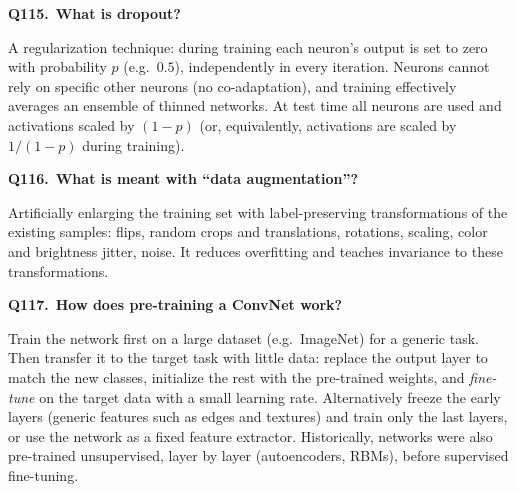 \documentclass[11pt,a4paper]{article}
\newcommand{\keep}[1]{\par
  \ifdim\dimexpr\pagegoal-\pagetotal\relax<#1\relax\newpage\fi}
\newcommand{\q}[2]{\keep{2.5cm}\medskip
  {\sffamily\bfseries\color{questc}Q#1.}\ {\sffamily\bfseries #2}\par}
\begin{document}
\q{115}{What is dropout?}
A regularization technique: during training each neuron's output is set to
zero with probability $p$ (e.g.\ $0.5$), independently in every iteration.
Neurons cannot rely on specific other neurons (no co-adaptation), and training
effectively averages an ensemble of thinned networks. At test time all neurons
are used and activations scaled by $(1-p)$ (or, equivalently, activations are
scaled by $1/(1-p)$ during training).

\q{116}{What is meant with ``data augmentation''?}
Artificially enlarging the training set with label-preserving transformations
of the existing samples: flips, random crops and translations, rotations,
scaling, color and brightness jitter, noise. It reduces overfitting and teaches
invariance to these transformations.

\q{117}{How does pre-training a ConvNet work?}
Train the network first on a large dataset (e.g.\ ImageNet) for a generic task.
Then transfer it to the target task with little data: replace the output layer
to match the new classes, initialize the rest with the pre-trained weights, and
\emph{fine-tune} on the target data with a small learning rate. Alternatively
freeze the early layers (generic features such as edges and textures) and train
only the last layers, or use the network as a fixed feature extractor.
Historically, networks were also pre-trained unsupervised, layer by layer
(autoencoders, RBMs), before supervised fine-tuning.
\end{document}

